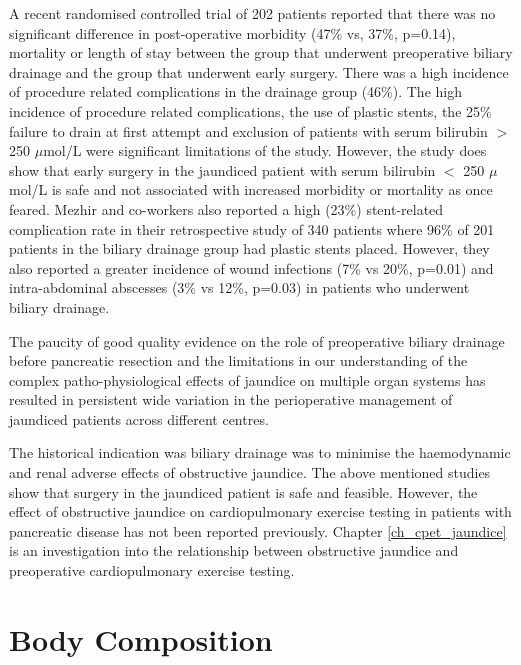 A recent randomised controlled trial of 202 patients reported that there was no significant difference in post-operative morbidity (47\% vs, 37\%, p=0.14), mortality or length of stay between the group that underwent preoperative biliary drainage and the group that underwent early surgery. There was a high incidence of procedure related complications in the drainage group (46\%). The high incidence of procedure related complications, the use of plastic stents, the 25\% failure to drain at first attempt and exclusion of patients with serum bilirubin $>$ 250 $\mu$mol/L were significant limitations of the study. However, the study does show that early surgery in the jaundiced patient with serum bilirubin $<$ 250 $\mu$mol/L is safe and not associated with increased morbidity or mortality as once feared. Mezhir and co-workers also reported a high (23\%) stent-related complication rate in their retrospective study of 340 patients where 96\% of 201 patients in the biliary drainage group had plastic stents placed. However, they also reported a greater incidence of wound infections (7\% vs 20\%, p=0.01) and intra-abdominal abscesses (3\% vs 12\%, p=0.03) in patients who underwent biliary drainage.

The paucity of good quality evidence on the role of preoperative biliary drainage before pancreatic resection \parencite{wang_preoperative_2008} and the limitations in our understanding of the complex patho-physiological effects of jaundice on multiple organ systems has resulted in persistent wide variation in the perioperative management of jaundiced patients across different centres.

The historical indication was biliary drainage was to minimise the haemodynamic and renal adverse effects of obstructive jaundice. The above mentioned studies show that surgery in the jaundiced patient is safe and feasible. However, the effect of obstructive jaundice on cardiopulmonary exercise testing in patients with pancreatic disease has not been reported previously. Chapter \ref{ch_cpet_jaundice} is an investigation into the relationship between obstructive jaundice and preoperative cardiopulmonary exercise testing.

\section{Body Composition}
